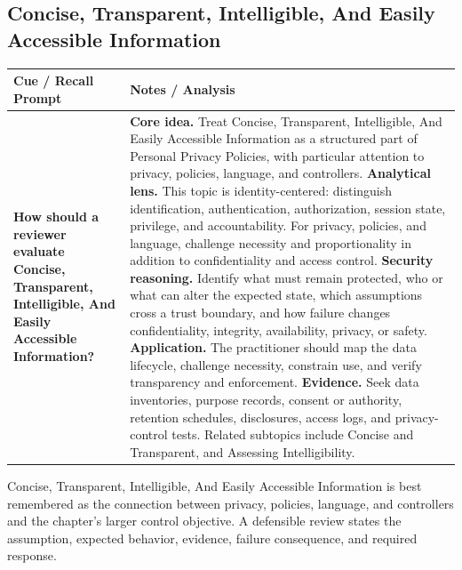 \documentclass[11pt]{article}
\newcommand{\CornellHeader}{%
\rowcolor{Navy}\color{white}\bfseries Cue / Recall Prompt & \color{white}\bfseries Notes / Analysis\\\hline}
\newcommand{\CornellRow}[2]{%
\cellcolor{CueGray}\RaggedRight\textbf{#1} & \RaggedRight #2\\\hline}
\begin{document}
\subsection*{Concise, Transparent, Intelligible, And Easily Accessible Information}
\begin{longtable}{>{\RaggedRight\arraybackslash}p{}|>{\RaggedRight\arraybackslash}p{}}
\CornellHeader
\CornellRow{How should a reviewer evaluate Concise, Transparent, Intelligible, And Easily Accessible Information?}{\textbf{Core idea.} Treat Concise, Transparent, Intelligible, And Easily Accessible Information as a structured part of Personal Privacy Policies, with particular attention to privacy, policies, language, and controllers. \textbf{Analytical lens.} This topic is identity-centered: distinguish identification, authentication, authorization, session state, privilege, and accountability. For privacy, policies, and language, challenge necessity and proportionality in addition to confidentiality and access control. \textbf{Security reasoning.} Identify what must remain protected, who or what can alter the expected state, which assumptions cross a trust boundary, and how failure changes confidentiality, integrity, availability, privacy, or safety. \textbf{Application.} The practitioner should map the data lifecycle, challenge necessity, constrain use, and verify transparency and enforcement. \textbf{Evidence.} Seek data inventories, purpose records, consent or authority, retention schedules, disclosures, access logs, and privacy-control tests. Related subtopics include Concise and Transparent, and Assessing Intelligibility.}
\end{longtable}
\begin{topicsummary}
Concise, Transparent, Intelligible, And Easily Accessible Information is best remembered as the connection between privacy, policies, language, and controllers and the chapter's larger control objective. A defensible review states the assumption, expected behavior, evidence, failure consequence, and required response.
\end{topicsummary}
\end{document}
